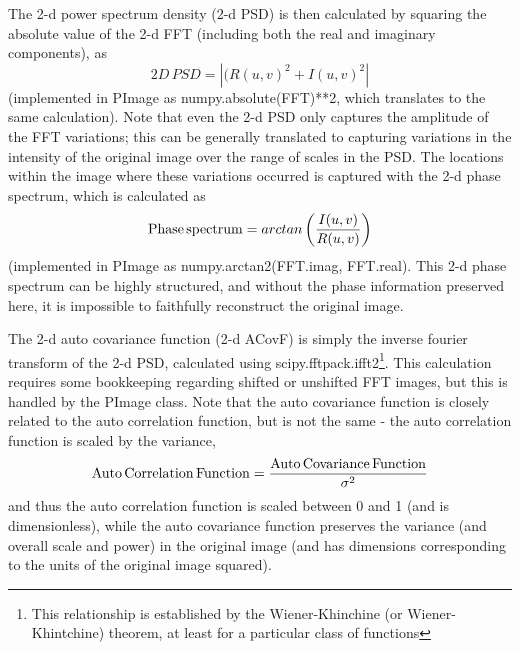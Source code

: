 \documentclass[11pt,preprint]{aastex}
\begin{document}
The 2-d power spectrum density (2-d PSD) is then calculated by squaring the absolute value of the 2-d FFT (including both the real and imaginary components), as
\begin{equation}
2D\, PSD= \left| (R(u,v)^2 + I(u,v)^2 \right|
\end{equation}
(implemented in PImage as numpy.absolute(FFT)**2, which translates to the same calculation).  Note that even the 2-d PSD only captures the amplitude of the FFT variations; this can be generally translated to capturing variations in the intensity of the original image over the range of scales in the PSD. The locations within the image where these variations occurred is captured with the 2-d phase spectrum, which is calculated as
\begin{equation}
{\rm Phase\,spectrum} = arctan\left(I(u,v) \over R(u,v) \right)
\end{equation}
(implemented in PImage as numpy.arctan2(FFT.imag, FFT.real). This 2-d phase spectrum can be highly structured, and without the phase information preserved here, it is impossible to faithfully reconstruct the original image. 

The 2-d auto covariance function (2-d ACovF) is simply the inverse fourier transform of the 2-d PSD, calculated using scipy.fftpack.ifft2\footnote{This relationship is established by the Wiener-Khinchine (or Wiener-Khintchine) theorem, at least for a particular class of functions}.  This calculation requires some bookkeeping regarding shifted or unshifted FFT images, but this is handled by the PImage class.  Note that the auto covariance function is closely related to the auto correlation function, but is not the same - the auto correlation function is scaled by the variance, 
\begin{equation}
\rm{Auto\,Correlation\,Function} = {\rm{Auto\,Covariance\,Function} \over \sigma^2}
\end{equation}
and thus the auto correlation function is scaled between 0 and 1 (and is dimensionless), while the auto covariance function preserves the variance (and overall scale and power) in the original image (and has dimensions corresponding to the units of the original image squared). 
\end{document}

